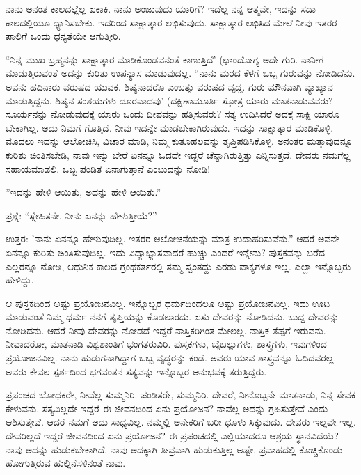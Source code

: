 ನಾನು ಅನಂತ ಕಾಲದಲ್ಲೆಲ್ಲ ಏಕಾಕಿ. ನಾನು ಅಂಜುವುದು ಯಾರಿಗೆ? ಇದೆಲ್ಲ ನನ್ನ ಆತ್ಮವೇ, ಇದನ್ನು ಸದಾ ಕಾಲದಲ್ಲಿಯೂ ಧ್ಯಾನಿಸಬೇಕು. ಇದರಿಂದ ಸಾಕ್ಷಾತ್ಕಾರ ಲಭಿಸುವುದು. ಸಾಕ್ಷಾತ್ಕಾರ ಲಭಿಸಿದ ಮೇಲೆ ನೀವು ಇತರರ ಪಾಲಿಗೆ ಒಂದು ಧನ್ಯತೆಯೇ ಆಗುತ್ತೀರಿ.

“ನಿನ್ನ ಮುಖ ಬ್ರಹ್ಮನನ್ನು ಸಾಕ್ಷಾತ್ಕಾರ ಮಾಡಿಕೊಂಡವನಂತೆ ಕಾಣುತ್ತಿದೆ' (ಛಾಂದೋಗ್ಯ  ಅದೇ ಗುರಿ. ನಾನೀಗ ಮಾಡುತ್ತಿರುವಂತೆ ಅದನ್ನು ಕುರಿತು ಉಪನ್ಯಾಸ ಮಾಡುವುದಲ್ಲ. “ನಾನು ಮರದ ಕೆಳಗೆ ಒಬ್ಬ ಗುರುವನ್ನು ನೋಡಿದೆನು. ಅವನು ಹದಿನಾರು ವರುಷದ ಯುವಕ. ಶಿಷ್ಯನಾದರೊ ಎಂಬತ್ತು ವರುಷದ ವೃದ್ದ. ಗುರು ಮೌನವಾಗಿ ವ್ಯಾಖ್ಯಾನ ಮಾಡುತ್ತಿದ್ದನು. ಶಿಷ್ಯನ ಸಂಶಯಗಳು ದೂರವಾದವು' (ದಕ್ಷಿಣಾಮೂರ್ತಿ ಸ್ತೋತ್ರ  ಯಾರು ಮಾತನಾಡುವವರು? ಸೂರ್ಯನನ್ನು ನೋಡುವುದಕ್ಕೆ ಯಾರು ಒಂದು ದೀಪವನ್ನು ಹತ್ತಿಸುವರು? ಸತ್ಯ ಉದಿಸಿದರೆ ಅದಕ್ಕೆ ಸಾಕ್ಷಿ ಯಾರೂ ಬೇಕಾಗಿಲ್ಲ. ಅದು ನಿಮಗೆ ಗೊತ್ತಿದೆ. ನೀವು ಇದನ್ನೇ ಮಾಡಬೇಕಾಗಿರುವುದು. ಇದನ್ನು ಸಾಕ್ಷಾತ್ಕಾರ ಮಾಡಿಕೊಳ್ಳಿ. ಮೊದಲು ಇದನ್ನು ಆಲೋಚಿಸಿ, ವಿಚಾರ ಮಾಡಿ, ನಿಮ್ಮ ಕುತೂಹಲವನ್ನು ತೃಪ್ತಿಪಡಿಸಿಕೊಳ್ಳಿ. ಅನಂತರ ಮತ್ತಾವುದನ್ನೂ ಕುರಿತು ಚಿಂತಿಸಬೇಡಿ, ನಾವು ಇನ್ನು ಬೇರೆ ಏನನ್ನೂ ಓದದೇ ಇದ್ದರೆ ಚೆನ್ನಾಗಿರುತ್ತಿತ್ತು ಎನ್ನಿಸುತ್ತದೆ. ದೇವರು ನಮಗೆಲ್ಲ ಸಹಾಯಮಾಡಲಿ. ಒಬ್ಬ ಪಂಡಿತ ಏನಾಗುತ್ತಾನೆ ಎಂಬುದನ್ನು ನೋಡಿ!

''ಇದನ್ನು ಹೇಳಿ ಆಯಿತು, ಅದನ್ನು ಹೇಳಿ ಆಯಿತು.”

ಪ್ರಶ್ನೆ: “ಸ್ನೇಹಿತನೇ, ನೀನು ಏನನ್ನು ಹೇಳುತ್ತೀಯೆ?”

ಉತ್ತರ: 'ನಾನು ಏನನ್ನೂ ಹೇಳುವುದಿಲ್ಲ. ಇತರರ ಆಲೋಚನೆಯನ್ನು ಮಾತ್ರ ಉದಾಹರಿಸುವೆನು.” ಆದರೆ ಅವನೇ ಏನನ್ನೂ ಕುರಿತು ಚಿಂತಿಸುವುದಿಲ್ಲ. ಇದು ವಿದ್ಯಾಭ್ಯಾಸವಾದರೆ ಹುಚ್ಚು ಎಂದರೆ ಇನ್ನೇನು? ಪುಸ್ತಕವನ್ನು ಬರೆದ ಎಲ್ಲರನ್ನೂ ನೋಡಿ, ಆಧುನಿಕ ಕಾಲದ ಗ್ರಂಥಕರ್ತರಲ್ಲಿ ತಮ್ಮ ಸ್ವಂತದ್ದು ಎರಡು ವಾಕ್ಯಗಳೂ ಇಲ್ಲ. ಎಲ್ಲಾ ಇನ್ನೊಬ್ಬರು ಹೇಳಿದ್ದು.

ಆ ಪುಸ್ತಕದಿಂದ ಅಷ್ಟು ಪ್ರಯೋಜನವಿಲ್ಲ. ಇನ್ನೊಬ್ಬರ ಧರ್ಮದಿಂದಲೂ ಅಷ್ಟು ಪ್ರಯೋಜನವಿಲ್ಲ. ಇದು ಊಟ ಮಾಡುವಂತೆ ನಿಮ್ಮ ಧರ್ಮ ನನಗೆ ತೃಪ್ತಿಯನ್ನು ಕೊಡಲಾರದು. ಏಸು ದೇವರನ್ನು ನೋಡಿದನು. ಬುದ್ದ ದೇವರನ್ನು ನೋಡಿದನು. ಆದರೆ ನೀವು ದೇವರನ್ನು ನೋಡದೆ ಇದ್ದರೆ ನಾಸ್ತಿಕರಿಗಿಂತ ಮೇಲಲ್ಲ. ನಾಸ್ತಿಕ ತೆಪ್ಪಗೆ ಇರುವನು. ನೀವಾದರೋ, ಮಾತನಾಡಿ ವಿಶ್ವಶಾಂತಿಗೆ ಭಂಗತರುವಿರಿ. ಪುಸ್ತಕಗಳು, ಬೈಬಲ್ಲುಗಳು, ಶಾಸ್ತ್ರಗಳು, ಇವುಗಳಿಂದ ಪ್ರಯೋಜನವಿಲ್ಲ. ನಾನು ಹುಡುಗನಾಗಿದ್ದಾಗ ಒಬ್ಬ ವೃದ್ಧರನ್ನು ಕಂಡೆ. ಅವರು ಯಾವ ಶಾಸ್ತ್ರವನ್ನೂ ಓದಿದವರಲ್ಲ. ಅವರು ಕೇವಲ ಸ್ಪರ್ಶದಿಂದ ಭಗವಂತನ ಸತ್ಯವನ್ನು ಇನ್ನೊಬ್ಬರ ಅನುಭವಕ್ಕೆ ತರುತ್ತಿದ್ದರು.

ಪ್ರಪಂಚದ ಬೋಧಕರೇ, ನೀವೆಲ್ಲ ಸುಮ್ಮನಿರಿ. ಪಂಡಿತರೇ, ಸುಮ್ಮನಿರಿ. ದೇವರೆ, ನೀನೊಬ್ಬನೇ ಮಾತನಾಡು, ನಿನ್ನ ಸೇವಕ ಕೇಳುವನು. ಸತ್ಯವಿಲ್ಲದೇ ಇದ್ದರೆ ಈ ಜೀವನದಿಂದ ಏನು ಪ್ರಯೋಜನ? ನಾವೆಲ್ಲ ಅದನ್ನು ಗ್ರಹಿಸುತ್ತೇವೆ ಎಂದು ಆಶಿಸುತ್ತೇವೆ. ಆದರೆ ನಮಗೆ ಅದು ಸಾಧ್ಯವಿಲ್ಲ. ನಮ್ಮಲ್ಲಿ ಅನೇಕರಿಗೆ ಬರೀ ಧೂಳು ಸಿಕ್ಕುವುದು. ದೇವರು ಇಲ್ಲವೇ ಇಲ್ಲ. ದೇವರಿಲ್ಲದೆ ಇದ್ದರೆ ಜೀವನದಿಂದ ಏನು ಪ್ರಯೋಜನ? ಈ ಪ್ರಪಂಚದಲ್ಲಿ ಎಲ್ಲಿಯಾದರೂ ಆಶ್ರಯ ಸ್ಥಾನವಿದೆಯೆ? ನಾವು ಅದನ್ನು ಹುಡುಕಬೇಕಾಗಿದೆ. ನಾವು ಅದಕ್ಕಾಗಿ ತೀವ್ರವಾಗಿ ಹುಡುಕುತ್ತಿಲ್ಲ ಅಷ್ಟೇ. ಪ್ರವಾಹದಲ್ಲಿ ಕೊಚ್ಚಿಕೊಂಡು ಹೋಗುತ್ತಿರುವ ಹುಲ್ಲಿನೆಸಳಿನಂತೆ ನಾವು.

